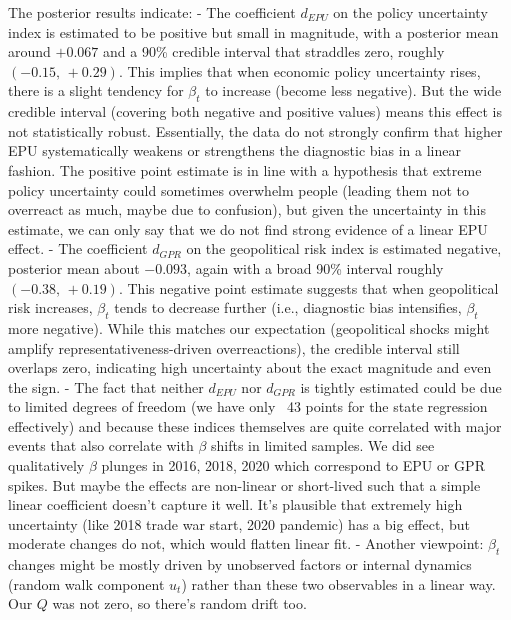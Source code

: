 \documentclass[12pt]{article}
\begin{document}
The posterior results indicate:
- The coefficient $d_{EPU}$ on the policy uncertainty index is estimated to be positive but small in magnitude, with a posterior mean around $+0.067$ and a 90\% credible interval that straddles zero, roughly $(-0.15,\,+0.29)$. This implies that when economic policy uncertainty rises, there is a slight tendency for $\beta_t$ to increase (become less negative). But the wide credible interval (covering both negative and positive values) means this effect is not statistically robust. Essentially, the data do not strongly confirm that higher EPU systematically weakens or strengthens the diagnostic bias in a linear fashion. The positive point estimate is in line with a hypothesis that extreme policy uncertainty could sometimes overwhelm people (leading them not to overreact as much, maybe due to confusion), but given the uncertainty in this estimate, we can only say that we do not find strong evidence of a linear EPU effect.
- The coefficient $d_{GPR}$ on the geopolitical risk index is estimated negative, posterior mean about $-0.093$, again with a broad 90\% interval roughly $(-0.38,\,+0.19)$. This negative point estimate suggests that when geopolitical risk increases, $\beta_t$ tends to decrease further (i.e., diagnostic bias intensifies, $\beta_t$ more negative). While this matches our expectation (geopolitical shocks might amplify representativeness-driven overreactions), the credible interval still overlaps zero, indicating high uncertainty about the exact magnitude and even the sign.
- The fact that neither $d_{EPU}$ nor $d_{GPR}$ is tightly estimated could be due to limited degrees of freedom (we have only ~43 points for the state regression effectively) and because these indices themselves are quite correlated with major events that also correlate with $\beta$ shifts in limited samples. We did see qualitatively $\beta$ plunges in 2016, 2018, 2020 which correspond to EPU or GPR spikes. But maybe the effects are non-linear or short-lived such that a simple linear coefficient doesn't capture it well. It's plausible that extremely high uncertainty (like 2018 trade war start, 2020 pandemic) has a big effect, but moderate changes do not, which would flatten linear fit.
- Another viewpoint: $\beta_t$ changes might be mostly driven by unobserved factors or internal dynamics (random walk component $u_t$) rather than these two observables in a linear way. Our $Q$ was not zero, so there's random drift too.
\end{document}
